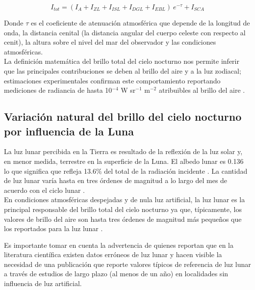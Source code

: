 \begin{equation}
I_{tot} = (I_A + I_{ZL} + I_{ISL} + I_{DGL} + I_{EBL})\:e^{-\tau} + I_{SCA}
\end{equation}

\vspace{2mm} 

Donde $\tau$ es el coeficiente de atenuación atmosférica que depende de la longitud de onda, la distancia cenital (la distancia angular del cuerpo celeste con respecto al cenit), la altura sobre el nivel del mar del observador y las condiciones atmosféricas.\\ 

La definición matemática del brillo total del cielo nocturno nos permite inferir que las principales contribuciones se deben al brillo del aire y a la luz zodiacal; estimaciones experimentales confirman este comportamiento reportando mediciones de radiancia de hasta 10$^{-4}$ W sr$^{-1}$  m$^{-2}$ atribuibles al brillo del aire \citep{Leinert1998}.\\ 

\subsection{Variación natural del brillo del cielo nocturno por influencia de la Luna}

La luz lunar percibida en la Tierra es resultado de la reflexión de la luz solar y, en menor medida, terrestre en la superficie de la Luna. El albedo lunar es 0.136 lo que significa que refleja 13.6\% del total de la radiación incidente \citep{Matthews2008}. La cantidad de luz lunar varía hasta en tres órdenes de magnitud a lo largo del mes de acuerdo con el ciclo lunar \citep{Kyba2017}.\\

En condiciones atmosféricas despejadas y de nula luz artificial, la luz lunar es la principal responsable del brillo total del cielo nocturno ya que, típicamente, los valores de brillo del aire son hasta tres órdenes de magnitud más pequeños que los reportados para la luz lunar \citep{Hanel2018}.\\

\newpage

Es importante tomar en cuenta la advertencia de \cite{Kyba2017} quienes reportan que en la literatura científica existen datos erróneos de luz lunar y hacen visible la necesidad de una publicación que reporte valores típicos de referencia de luz lunar a través de estudios de largo plazo (al menos de un año) en localidades sin influencia de luz artificial.\\ 

